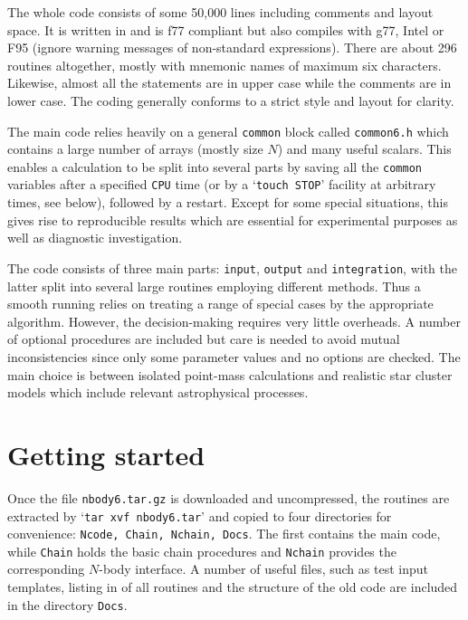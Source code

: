 \documentclass[12pt]{article}
\begin{document}
The whole code consists of some 50,000 lines including comments and layout
space.
It is written in {} and is f77 compliant but also compiles
with g77, Intel or F95 (ignore warning messages of non-standard expressions).
There are about 296 routines altogether, mostly with mnemonic names of
maximum six characters.
Likewise, almost all the {} statements are in upper case while
the comments are in lower case.
The coding generally conforms to a strict style and layout for clarity.

The main code relies heavily on a general {\tt common} block called
{\tt common6.h} which contains a large number of arrays (mostly size $N$) and
many useful scalars.
This enables a calculation to be split into several parts by saving all the
{\tt common} variables after a specified {\tt CPU} time (or by a
`{\tt touch STOP}' facility at arbitrary times, see below), followed by a
restart.
Except for some special situations, this gives rise to reproducible results
which are essential for experimental purposes as well as diagnostic
investigation.

The code consists of three main parts: {\tt input}, {\tt output} and
{\tt integration}, with the latter split into several large routines
employing different methods.
Thus a smooth running relies on treating a range of special cases by the
appropriate algorithm.
However, the decision-making requires very little overheads.
A number of optional procedures are included but care is needed to avoid
mutual inconsistencies since only some parameter values and no options are
checked.
The main choice is between isolated point-mass calculations and
realistic star cluster models which include relevant astrophysical processes.

\section{Getting started}

Once the file {\tt nbody6.tar.gz} is downloaded and uncompressed, the routines
are extracted by `{\tt tar xvf nbody6.tar}' and copied to four directories
for convenience: {\tt Ncode, Chain, Nchain, Docs}.
The first contains the main code, while {\tt Chain} holds the basic chain
procedures and {\tt Nchain} provides the corresponding $N$-body interface.
A number of useful files, such as test input templates, listing in {}
of all routines and the structure of the old code {} are included
in the directory {\tt Docs}.
\end{document}
